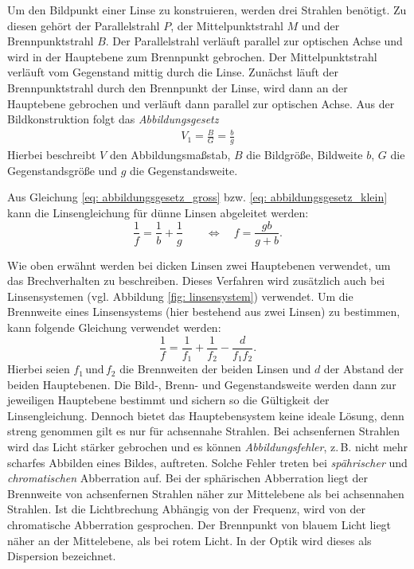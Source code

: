 Um den Bildpunkt einer Linse zu konstruieren, werden drei Strahlen benötigt.
Zu diesen gehört der Parallelstrahl $P$, der Mittelpunktstrahl $M$ und der
Brennpunktstrahl $B$.
Der Parallelstrahl verläuft parallel zur optischen Achse und wird in der Hauptebene
zum Brennpunkt gebrochen. Der Mittelpunktstrahl verläuft vom Gegenstand mittig durch die
Linse. Zunächst läuft der Brennpunktstrahl durch den Brennpunkt der Linse, wird dann
an der Hauptebene gebrochen und verläuft dann parallel zur optischen Achse.
Aus der Bildkonstruktion folgt das \emph{Abbildungsgesetz} %
\begin{align}
  \label{eq: abbildungsgesetz_gross}
  V_1=\frac{B}{G}=\frac{b}{g} %
\end{align}
Hierbei beschreibt $V$ den Abbildungsmaßstab, $B$ die Bildgröße, Bildweite $b$, $G$ die Gegenstandsgröße
und $g$ die Gegenstandsweite. %

Aus Gleichung \eqref{eq: abbildungsgesetz_gross} bzw. \eqref{eq: abbildungsgesetz_klein} %
kann die Linsengleichung für dünne Linsen abgeleitet werden:
\begin{equation}
  \label{eq: linsengleichung}
  \frac{1}{f}= \frac{1}{b}+  \frac{1}{g} \qquad \Leftrightarrow \quad f= \frac{gb}{g+b}.
\end{equation}

Wie oben erwähnt werden bei dicken Linsen zwei Hauptebenen verwendet, um das Brechverhalten
zu beschreiben. Dieses Verfahren wird zusätzlich auch bei Linsensystemen (vgl. Abbildung \ref{fig: linsensystem}) verwendet. %
Um die Brennweite eines Linsensystems (hier bestehend aus zwei Linsen) zu bestimmen, kann folgende Gleichung verwendet werden:
\begin{equation}
  \label{eq: gleichung_linsensystem}
  \frac{1}{f}=\frac{1}{f_1}+\frac{1}{f_2}-\frac{d}{f_1f_2}.
\end{equation}
Hierbei seien $f_1 \, \text{und} \, f_2$ die Brennweiten der beiden Linsen und $d$ der
Abstand der beiden Hauptebenen.
Die Bild-, Brenn- und Gegenstandsweite werden dann zur jeweiligen Hauptebene
bestimmt und sichern so die Gültigkeit der Linsengleichung.
Dennoch bietet das Hauptebensystem keine ideale Lösung, denn streng genommen
gilt es nur für achsennahe Strahlen. Bei achsenfernen Strahlen wird das Licht stärker
gebrochen und es können \emph{Abbildungsfehler}, z.\,B. nicht mehr scharfes Abbilden eines Bildes,
auftreten. Solche Fehler treten bei \emph{spährischer} und \emph{chromatischen} Abberration auf.
Bei der sphärischen Abberration liegt der Brennweite von achsenfernen Strahlen näher zur
Mittelebene als bei achsennahen Strahlen.
Ist die Lichtbrechung Abhängig von der Frequenz,
wird von der chromatische Abberration gesprochen.
Der Brennpunkt von blauem Licht liegt näher an der Mittelebene, als %
bei rotem Licht. In der Optik wird dieses als Dispersion bezeichnet.

